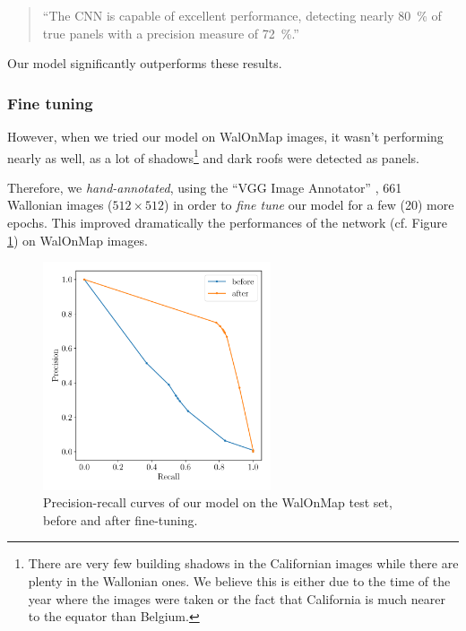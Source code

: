 \documentclass[a4paper, 12pt]{article}
\begin{document}
\begin{quote}
    \enquote{The CNN is capable of excellent performance, detecting nearly \SI{80}{\percent} of true panels with a precision measure of \SI{72}{\percent}.}
\end{quote}

Our model significantly outperforms these results.

\subsubsection{Fine tuning}

However, when we tried our model on WalOnMap images, it wasn't performing nearly as well, as a lot of shadows\footnote{There are very few building shadows in the Californian images while there are plenty in the Wallonian ones. We believe this is either due to the time of the year where the images were taken or the fact that California is much nearer to the equator than Belgium.} and dark roofs were detected as panels.

Therefore, we \emph{hand-annotated}, using the \enquote{VGG Image Annotator} \parencite{dutta2019vgg}, 661 Wallonian images ($512 \times 512$) in order to \emph{fine tune} our model for a few (20) more epochs. This improved dramatically the performances of the network (cf. Figure \ref{fig:comparison_fine_tuning}) on WalOnMap images.

\begin{figure}[h]
    \centering
    \includegraphics[width=0.6\textwidth]{resources/pdf/before_after.pdf}
    \vspace{-1em}
    \caption{Precision-recall curves of our model on the WalOnMap test set, before and after fine-tuning.}
    \label{fig:comparison_fine_tuning}
\end{figure}
\end{document}
